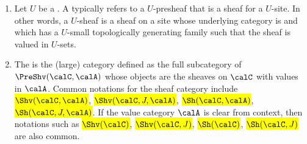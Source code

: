 \begin{definition}
\begin{enumerate}
    \item Let $U$ be a . A  typically refers to a $U$-presheaf that is a sheaf for a $U$-site. In other words, a $U$-sheaf is a sheaf on a site whose underlying category is  and which has a $U$-small topologically generating family such that the sheaf is valued in $U$-sets.

    \item The  is the (large) category defined as the full subcategory of $\PreShv(\calC, \calA)$ whose objects are the sheaves on $\calC$ with values in $\calA$. Common notations for the sheaf category include \hl{$\Shv(\calC, \calA)$}, \hl{$\Shv(\calC, J, \calA)$}, \hl{$\Sh(\calC, \calA)$}, \hl{$\Sh(\calC, J, \calA)$}. If the value category $\calA$ is clear from context, then notations such as \hl{$\Shv(\calC)$}, \hl{$\Shv(\calC, J)$}, \hl{$\Sh(\calC)$}, \hl{$\Sh(\calC, J)$} are also common.

\end{enumerate}
\end{definition}
